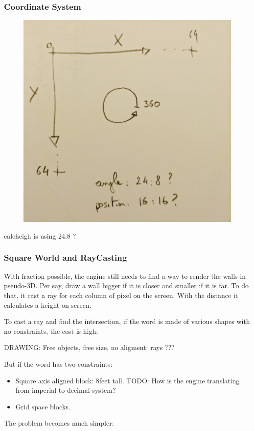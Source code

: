 \subsubsection{Coordinate System}
\par
\begin{figure}[H]
  \centering
 \includegraphics[width=\textwidth]{imgs/drawings/coordinate_system.png}
\end{figure}
\par
calcheigh is using 24:8 ?


\subsubsection{Square World and RayCasting}
With fraction possible, the engine still needs to find a way to render the walls in pseudo-3D. Per say, draw a wall bigger if it is closer and smaller if it is far. To do that, it cast a ray for each column of pixel on the screen. With the distance it calculates a height on screen.\\
\par
To cast a ray and find the intersection, if the word is made of various shapes with no constraints, the cost is high:\\
\par
DRAWING: Free objects, free size, no aligment: rays ???\\
\par
But if the word has two constraints:
\begin{itemize}
\item Square axis aligned block: 8feet tall. TODO: How is the engine translating from imperial to decimal system?
\item Grid space blocks.
\end{itemize}
\par
The problem becomes much simpler:\\
\par
\begin{figure}[H]
\centering
 
\end{figure}

